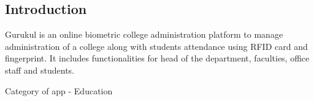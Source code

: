 \subsection{Introduction} 
\hspace{1cm}Gurukul is an online biometric college administration platform to manage administration of a college along with students attendance using RFID card and fingerprint. It includes functionalities for head of the department, faculties, office staff and students.

\vspace{5mm}
\hspace{6mm}Category of app - Education